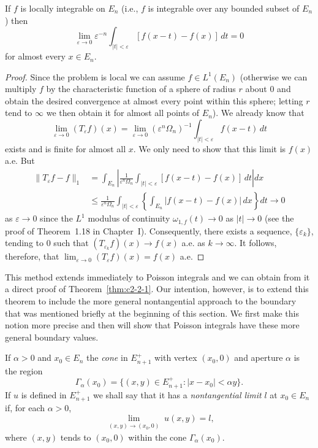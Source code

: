 \begin{corollary}\label{cor:c2-3-14}
If $f$ is locally integrable on $E_n$ (i.e., $f$ is integrable over any bounded subset of $E_n$) then
\[
\lim_{\varepsilon \to 0} \varepsilon^{-n} \int_{|t| < \varepsilon} [f(x - t) - f(x)]\,dt = 0
\]
for almost every $x \in E_n$.
\end{corollary}

\begin{proof}
Since the problem is local we can assume $f \in L^1(E_n)$ (otherwise we can multiply $f$ by the characteristic function of a sphere of radius $r$ about $0$ and obtain the desired convergence at almost every point within this sphere; letting $r$ tend to $\infty$ we then obtain it for almost all points of $E_n$). We already know that
\[
\lim_{\varepsilon \to 0} (T_\varepsilon f)(x) = \lim_{\varepsilon \to 0} (\varepsilon^n \Omega_n)^{-1} \int_{|t| < \varepsilon} f(x - t)\,dt
\]
exists and is finite for almost all $x$. We only need to show that this limit is $f(x)$ a.e. But
\[
\begin{aligned}
\|T_\varepsilon f - f\|_1 &= \int_{E_n} \left|\frac{1}{\varepsilon^n \Omega_n} \int_{|t| < \varepsilon} [f(x - t) - f(x)]\,dt\right| dx \\
&\leq \frac{1}{\varepsilon^n \Omega_n} \int_{|t| < \varepsilon} \left\{\int_{E_n} |f(x - t) - f(x)|\,dx\right\} dt \to 0
\end{aligned}
\]
as $\varepsilon \to 0$ since the $L^1$ modulus of continuity $\omega_{1,f}(t) \to 0$ as $|t| \to 0$ (see the proof of Theorem~1.18 in Chapter~I). Consequently, there exists a sequence, $\{\varepsilon_k\}$, tending to $0$ such that $(T_{\varepsilon_k} f)(x) \to f(x)$ a.e. as $k \to \infty$. It follows, therefore, that $\lim_{\varepsilon \to 0} (T_\varepsilon f)(x) = f(x)$ a.e.
\end{proof}

This method extends immediately to Poisson integrals and we can obtain from it a direct proof of Theorem~\ref{thm:c2-2-1}. Our intention, however, is to extend this theorem to include the more general nontangential approach to the boundary that was mentioned briefly at the beginning of this section. We first make this notion more precise and then will show that Poisson integrals have these more general boundary values.

If $\alpha > 0$ and $x_0 \in E_n$ the \emph{cone} in $E_{n+1}^+$ with vertex $(x_0, 0)$ and aperture $\alpha$ is the region
\[
\Gamma_\alpha(x_0) = \{(x, y) \in E_{n+1}^+ : |x - x_0| < \alpha y\}.
\]
If $u$ is defined in $E_{n+1}^+$ we shall say that it has a \emph{nontangential limit} $l$ at $x_0 \in E_n$ if, for each $\alpha > 0$,
\begin{equation}\label{eq:c2-3-15}
\lim_{\substack{(x,y) \to (x_0,0)}} u(x, y) = l,
\end{equation}
where $(x, y)$ tends to $(x_0, 0)$ within the cone $\Gamma_\alpha(x_0)$.

